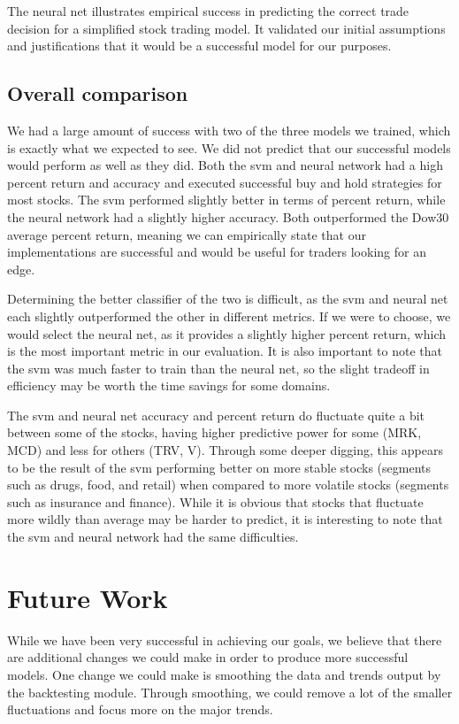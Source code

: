 \documentclass{article}
\begin{document}
The neural net illustrates empirical success in predicting the correct trade decision for a simplified stock trading model. It validated our initial assumptions and justifications that it would be a successful model for our purposes.

\subsection{Overall comparison}
We had a large amount of success with two of the three models we trained, which is exactly what we expected to see. We did not predict that our successful models would perform as well as they did. Both the svm and neural network had a high percent return and accuracy and executed successful buy and hold strategies for most stocks. The svm performed slightly better in terms of percent return, while the neural network had a slightly higher accuracy. Both outperformed the Dow30 average percent return, meaning we can empirically state that our implementations are successful and would be useful for traders looking for an edge.

Determining the better classifier of the two is difficult, as the svm and neural net each slightly outperformed the other in different metrics. If we were to choose, we would select the neural net, as it provides a slightly higher percent return, which is the most important metric in our evaluation. It is also important to note that the svm was much faster to train than the neural net, so the slight tradeoff in efficiency may be worth the time savings for some domains.

The svm and neural net accuracy and percent return do fluctuate quite a bit between some of the stocks, having higher predictive power for some (MRK, MCD) and less for others (TRV, V). Through some deeper digging, this appears to be the result of the svm performing better on more stable stocks (segments such as drugs, food, and retail) when compared to more volatile stocks (segments such as insurance and finance). While it is obvious that stocks that fluctuate more wildly than average may be harder to predict, it is interesting to note that the svm and neural network had the same difficulties.

\section{Future Work}
While we have been very successful in achieving our goals, we believe that there are additional changes we could make in order to produce more successful models. One change we could make is smoothing the data and trends output by the backtesting module. Through smoothing, we could remove a lot of the smaller fluctuations and focus more on the major trends.
\end{document}
